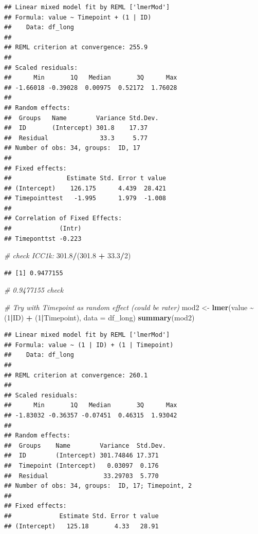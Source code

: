 \documentclass[
]{article}
\newenvironment{Shaded}{\begin{snugshade}}{\end{snugshade}}
\newcommand{\AttributeTok}[1]{\textcolor[rgb]{0.13,0.29,0.53}{#1}}
\newcommand{\CommentTok}[1]{\textcolor[rgb]{0.56,0.35,0.01}{\textit{#1}}}
\newcommand{\DecValTok}[1]{\textcolor[rgb]{0.00,0.00,0.81}{#1}}
\newcommand{\FloatTok}[1]{\textcolor[rgb]{0.00,0.00,0.81}{#1}}
\newcommand{\FunctionTok}[1]{\textcolor[rgb]{0.13,0.29,0.53}{\textbf{#1}}}
\newcommand{\NormalTok}[1]{#1}
\newcommand{\OtherTok}[1]{\textcolor[rgb]{0.56,0.35,0.01}{#1}}
\newcommand{\SpecialCharTok}[1]{\textcolor[rgb]{0.81,0.36,0.00}{\textbf{#1}}}
\begin{document}
\begin{verbatim}
## Linear mixed model fit by REML ['lmerMod']
## Formula: value ~ Timepoint + (1 | ID)
##    Data: df_long
## 
## REML criterion at convergence: 255.9
## 
## Scaled residuals: 
##      Min       1Q   Median       3Q      Max 
## -1.66018 -0.39028  0.00975  0.52172  1.76028 
## 
## Random effects:
##  Groups   Name        Variance Std.Dev.
##  ID       (Intercept) 301.8    17.37   
##  Residual              33.3     5.77   
## Number of obs: 34, groups:  ID, 17
## 
## Fixed effects:
##               Estimate Std. Error t value
## (Intercept)    126.175      4.439  28.421
## Timepointtest   -1.995      1.979  -1.008
## 
## Correlation of Fixed Effects:
##             (Intr)
## Timeponttst -0.223
\end{verbatim}

\begin{Shaded}
\begin{Highlighting}[]
\CommentTok{\# check ICC1k:}
\FloatTok{301.8}\SpecialCharTok{/}\NormalTok{(}\FloatTok{301.8} \SpecialCharTok{+} \FloatTok{33.3}\SpecialCharTok{/}\DecValTok{2}\NormalTok{)}
\end{Highlighting}
\end{Shaded}

\begin{verbatim}
## [1] 0.9477155
\end{verbatim}

\begin{Shaded}
\begin{Highlighting}[]
\CommentTok{\# 0.9477155 check}

\CommentTok{\# Try with Timepoint as random effect (could be rater)}
\NormalTok{mod2 }\OtherTok{\textless{}{-}} \FunctionTok{lmer}\NormalTok{(value }\SpecialCharTok{\textasciitilde{}}\NormalTok{ (}\DecValTok{1}\SpecialCharTok{|}\NormalTok{ID) }\SpecialCharTok{+}\NormalTok{ (}\DecValTok{1}\SpecialCharTok{|}\NormalTok{Timepoint), }\AttributeTok{data =}\NormalTok{ df\_long)}
\FunctionTok{summary}\NormalTok{(mod2)}
\end{Highlighting}
\end{Shaded}

\begin{verbatim}
## Linear mixed model fit by REML ['lmerMod']
## Formula: value ~ (1 | ID) + (1 | Timepoint)
##    Data: df_long
## 
## REML criterion at convergence: 260.1
## 
## Scaled residuals: 
##      Min       1Q   Median       3Q      Max 
## -1.83032 -0.36357 -0.07451  0.46315  1.93042 
## 
## Random effects:
##  Groups    Name        Variance  Std.Dev.
##  ID        (Intercept) 301.74846 17.371  
##  Timepoint (Intercept)   0.03097  0.176  
##  Residual               33.29703  5.770  
## Number of obs: 34, groups:  ID, 17; Timepoint, 2
## 
## Fixed effects:
##             Estimate Std. Error t value
## (Intercept)   125.18       4.33   28.91
\end{verbatim}
\end{document}
